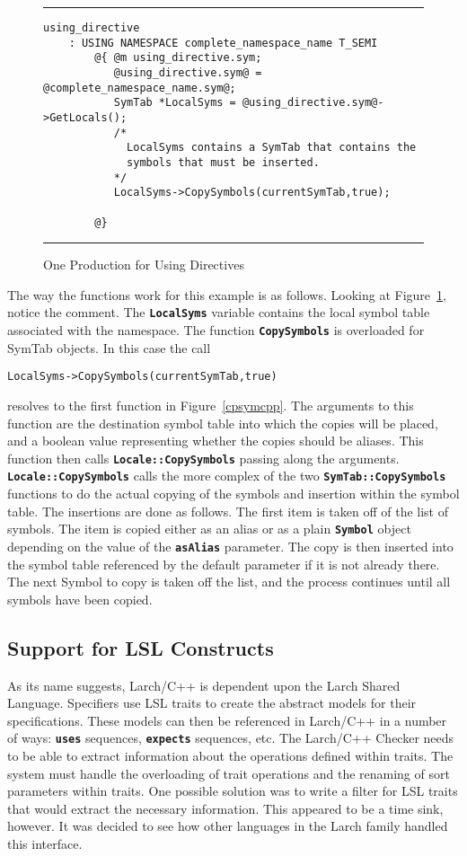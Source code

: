 \documentclass[12pt]{article} %
\newcommand{\reserved}[1]{\textbf{\texttt{#1}}} %
\newcommand{\UNSPACEFORBOX}{\vspace{-2ex}}
\newcommand{\HLINE}{\UNSPACEFORBOX%
\begin{flushleft}\rule{\textwidth}{0.01in}\end{flushleft}%
\UNSPACEFORBOX}
\newenvironment{BFIGURE}{

\begin{figure}
\small
\HLINE
}{
\HLINE
\normalsize
\end{figure}
}
\begin{document}
\begin{BFIGURE}
\begin{verbatim}
using_directive
    : USING NAMESPACE complete_namespace_name T_SEMI
        @{ @m using_directive.sym;
           @using_directive.sym@ = @complete_namespace_name.sym@;
           SymTab *LocalSyms = @using_directive.sym@->GetLocals();
           /*
             LocalSyms contains a SymTab that contains the
             symbols that must be inserted.
           */
           LocalSyms->CopySymbols(currentSymTab,true);

        @}
\end{verbatim}
\caption{One Production for Using Directives}
\label{usdlgram}
\end{BFIGURE}
The way the functions work for this example is as follows. Looking at
Figure~\ref{usdlgram}, notice the comment. The \reserved{LocalSyms}
variable contains the local symbol table associated with the
namespace. The function \reserved{CopySymbols} is overloaded for SymTab
objects. In this case the call
\begin{verbatim}
LocalSyms->CopySymbols(currentSymTab,true)
\end{verbatim}
 resolves to the first function in Figure~\ref{cpsymcpp}. The arguments
to this function are the destination symbol table into which the
copies will be placed, and a boolean value representing whether the
copies should be aliases. This function then calls
\reserved{Locale::CopySymbols} passing along the
arguments. \reserved{Locale::CopySymbols} calls the more complex of
the two \reserved{SymTab::CopySymbols} functions to do the actual
copying of the symbols and insertion within the symbol table. The
insertions are done as follows. The first item is taken off of the
list of symbols. The item is copied either as an alias or as a plain
\reserved{Symbol} object depending on the value of the
\reserved{asAlias} parameter. The 
copy is then inserted into the symbol table referenced by the default
parameter if it is not already there. The next Symbol to copy is taken
off the list, and the process continues until all symbols have been
copied.

\subsection{Support for LSL Constructs}
As its name suggests, Larch/C++ is dependent upon the Larch Shared
Language. Specifiers use LSL traits to create the abstract models for
their specifications. These models can then be referenced in Larch/C++
in a number of ways: \reserved{uses} sequences, \reserved{expects}
sequences, etc. The Larch/C++ Checker needs to be able to extract
information about the operations defined within traits. The system
must handle the overloading of trait operations and the renaming of
sort parameters within traits. One possible solution was to write a
filter for LSL traits that would extract the necessary
information. This appeared to be a time sink, however. It was decided
to see how other languages in the Larch family handled this interface.
\end{document}
